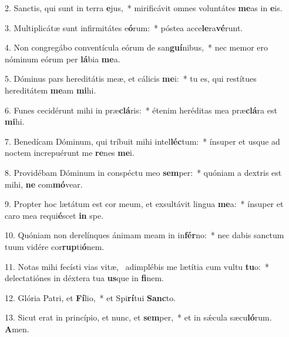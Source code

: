 2. Sanctis, qui sunt in terra \textbf{e}jus,~*  mirificávit omnes voluntátes \textbf{me}as in \textbf{e}is.\

3. Multiplicátæ sunt infirmitátes e\textbf{ó}rum:~*  póstea acce\textbf{le}ra\textbf{vé}runt.\

4. Non congregábo conventícula eórum de san\textbf{guí}nibus,~*  nec memor ero nóminum eórum per \textbf{lá}bia \textbf{me}a.\

5. Dóminus pars hereditátis meæ, et cálicis \textbf{me}i:~*  tu es, qui restítues hereditátem \textbf{me}am \textbf{mi}hi.\

6. Funes cecidérunt mihi in præ\textbf{clá}ris:~*  étenim heréditas mea præ\textbf{clá}ra est \textbf{mi}hi.\

7. Benedícam Dóminum, qui tríbuit mihi intel\textbf{léc}tum:~*  ínsuper et usque ad noctem increpuérunt me \textbf{re}nes \textbf{me}i.\

8. Providébam Dóminum in conspéctu meo \textbf{sem}per:~*  quóniam a dextris est mihi, \textbf{ne} com\textbf{mó}vear.\

9. Propter hoc lætátum est cor meum, et exsultávit lingua \textbf{me}a:~*  ínsuper et caro mea requi\textbf{é}scet \textbf{in} spe.\

10. Quóniam non derelínques ánimam meam in in\textbf{fér}no:~*  nec dabis sanctum tuum vidére cor\textbf{rup}ti\textbf{ó}nem.\

11. Notas mihi fecísti vias vitæ, \dag\  adimplébis me lætítia cum vultu \textbf{tu}o:~*  delectatiónes in déxtera tua \textbf{us}que in \textbf{fi}nem.\

12. Glória Patri, et \textbf{Fí}lio,~*  et Spi\textbf{rí}tui \textbf{Sanc}to.\

13. Sicut erat in princípio, et nunc, et \textbf{sem}per,~*  et in sǽcula sæcu\textbf{ló}rum. \textbf{A}men.\

